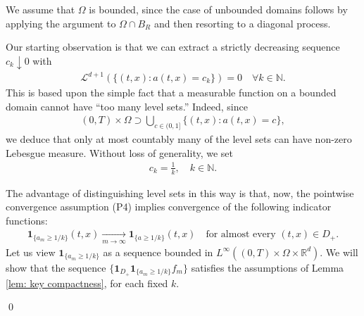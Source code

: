 \documentclass[10pt, reqno]{amsart}
\theoremstyle{plain}
\theoremstyle{definition}
\theoremstyle{remark}
\renewenvironment{proof}[1][\proofname]{\noindent{\scshape #1.\quad}}{\qed}
\numberwithin{equation}{section}
\newcommand{\bbN}{\mathbb N}
\newcommand{\R}{\mathbb{R}}
\begin{document}
\begin{proof}[Proof of Proposition \ref{prop: weighted fisher}]
    We assume that $\Omega$ is bounded, since the case of unbounded domains follows
    by applying the argument to $\Omega\cap B_R$ and then resorting to a diagonal process.

    Our starting observation is that we can extract a strictly decreasing sequence $c_k\downarrow 0$
    with
    \begin{align*}
        \mathscr{L}^{d+1}(\{(t,x):a(t,x) = c_k\}) = 0 \quad \forall k\in \bbN .
    \end{align*}
    This is based upon the simple fact that a measurable function on a bounded domain cannot have ``too many level sets.'' Indeed, since
    \begin{align*}
        (0,T)\times\Omega \supset \bigcup_{c\in (0,1]} \{(t,x): a(t,x) = c\},
    \end{align*}
    we deduce that only at most countably many of the level sets can have non-zero Lebesgue measure. Without loss of generality, we set
    \begin{align*}
        c_k = \frac{1}{k},\quad k\in \bbN.
    \end{align*}

    The advantage of distinguishing level sets in this way is that, now, the pointwise convergence assumption (P4) implies convergence of the following indicator functions:
    \begin{align}\label{eq: ind ptw}
        \mathbf{1}_{\{a_m \ge 1/k\}}(t,x) \xrightarrow[m\to\infty]{} \mathbf{1}_{\{a \ge 1/k\}}(t,x) \quad \text{for almost every }(t,x)\in D_+.
    \end{align}
    Let us view $\mathbf{1}_{\{a_m\ge 1/k\}}$ as a sequence bounded in $L^\infty((0,T)\times\Omega \times \R^d)$. We will show that the sequence $\{\mathbf{1}_{D_+} \mathbf{1}_{\{a_m \ge 1/k\}} f_m\}$ satisfies the assumptions of Lemma \ref{lem: key compactness}, for each fixed $k$. 


\end{proof}
\end{document}
